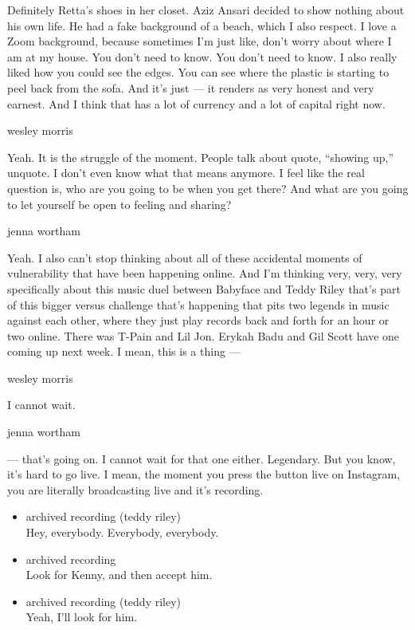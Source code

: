 Definitely Retta's shoes in her closet. Aziz Ansari decided to show
nothing about his own life. He had a fake background of a beach, which I
also respect. I love a Zoom background, because sometimes I'm just like,
don't worry about where I am at my house. You don't need to know. You
don't need to know. I also really liked how you could see the edges. You
can see where the plastic is starting to peel back from the sofa. And
it's just --- it renders as very honest and very earnest. And I think
that has a lot of currency and a lot of capital right now.

wesley morris

Yeah. It is the struggle of the moment. People talk about quote,
``showing up,'' unquote. I don't even know what that means anymore. I
feel like the real question is, who are you going to be when you get
there? And what are you going to let yourself be open to feeling and
sharing?

jenna wortham

Yeah. I also can't stop thinking about all of these accidental moments
of vulnerability that have been happening online. And I'm thinking very,
very, very specifically about this music duel between Babyface and Teddy
Riley that's part of this bigger versus challenge that's happening that
pits two legends in music against each other, where they just play
records back and forth for an hour or two online. There was T-Pain and
Lil Jon. Erykah Badu and Gil Scott have one coming up next week. I mean,
this is a thing ---

wesley morris

I cannot wait.

jenna wortham

--- that's going on. I cannot wait for that one either. Legendary. But
you know, it's hard to go live. I mean, the moment you press the button
live on Instagram, you are literally broadcasting live and it's
recording.

\begin{itemize}
\item
  archived recording (teddy riley)\\
  Hey, everybody. Everybody, everybody.
\item
  archived recording\\
  Look for Kenny, and then accept him.
\item
  archived recording (teddy riley)\\
  Yeah, I'll look for him.
\end{itemize}

